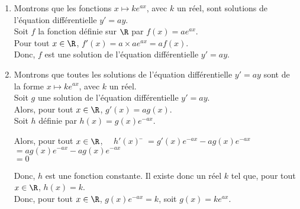 \documentclass[a4paper,11pt,cours]{nsi} %
\begin{document}
\begin{demonstration}
    \begin{enumerate}[label=\textbullet]
        \item Montrons que les fonctions $x\mapsto ke^{ax}$, avec $k$ un réel, sont solutions de l'équation différentielle $y'=ay$.\\
        Soit $f$ la fonction définie sur $\R$ par $f(x)=ae^{ax}$.\\
        Pour tout $x\in\R$, $f'(x)=a\times ae^{ax}=af(x)$.\\
        Donc, $f$ est une solution de l'équation différentielle $y'=ay$.
        \item Montrons que toutes les solutions de l'équation différentielle $y'=ay$ sont de la forme $x\mapsto ke^{ax}$, avec $k$ un réel.\\
        Soit $g$ une solution de l'équation différentielle $y'=ay$.\\
        Alors, pour tout $x\in\R$, $g'(x)=ag(x)$.\\
        Soit $h$ définie par $h(x)=g(x)e^{-ax}$.
        \begin{tabbing}
            Alors, pour tout $x\in\R$, $\quad h'(x)$ \= $=g'(x)e^{-ax}-ag(x)e^{-ax}$\\
            \> $=ag(x)e^{-ax}-ag(x)e^{-ax}$\\
            \> $=0$
        \end{tabbing}
        Donc, $h$ est une fonction constante. Il existe donc un réel $k$ tel que, pour tout $x\in\R$, $h(x)=k$.\\
        Donc, pour tout $x\in\R$, $g(x)e^{-ax}=k$, soit $g(x)=ke^{ax}$.
    \end{enumerate}
\end{demonstration}
\end{document}
